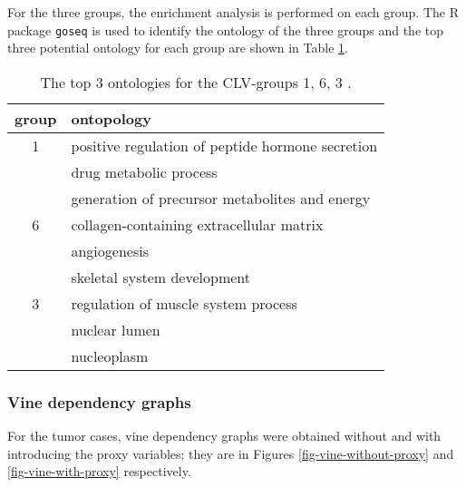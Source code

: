\documentclass[a4paper]{article}
\begin{document}
For the three groups,
the enrichment analysis is performed on each group. 
The R package \texttt{goseq} is used to identify the ontology of the three groups and the top three potential ontology for each group are shown in Table \ref{tab-ontoplogy}.

\begin{table}[H]
    \centering
\begin{tabular}{c|l}
\toprule
   group & ontopology \\
   \hline
    {1} &   {positive regulation of peptide hormone secretion }\\
    & {drug metabolic process}\\
    & {generation of precursor metabolites and energy}\\
    \midrule
    {6} & {collagen-containing extracellular matrix}\\
    &  %
    {angiogenesis}\\
    & %
    {skeletal system development}
    \\
    \midrule
   {3} &  {regulation of muscle system process } \\
   & {nuclear lumen} \\
   &{ nucleoplasm   } \\

    \bottomrule
\end{tabular}
\caption{The top 3 ontologies for the CLV-groups {1, 6, 3} .}
\label{tab-ontoplogy}
\end{table}

\subsubsection*{Vine dependency graphs}

For the tumor cases, vine dependency graphs were obtained without and with introducing the proxy variables; they are in 
Figures \ref{fig-vine-without-proxy} and \ref{fig-vine-with-proxy} respectively. 
\end{document}
